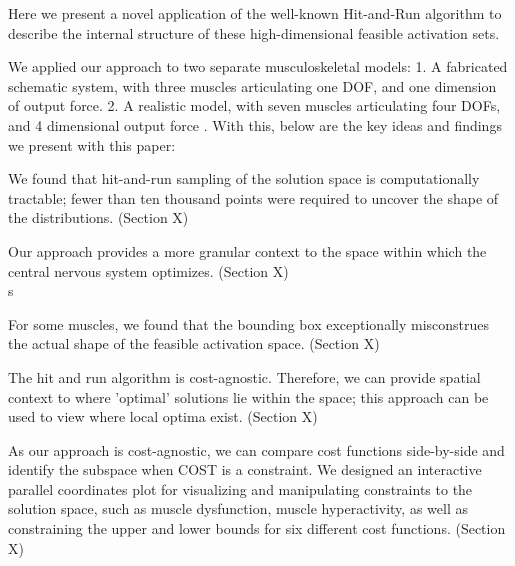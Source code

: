 Here we present a novel application of the well-known Hit-and-Run algorithm \cite{smith1984efficient} to describe the internal structure of these high-dimensional feasible activation sets.

We applied our approach to two separate musculoskeletal models:
1. A fabricated schematic system, with three muscles articulating one DOF, and one dimension of output force.
2. A realistic model, with seven muscles articulating four DOFs, and 4 dimensional output force \cite{Valero-Cuevas1998Large}.
With this, below are the key ideas and findings we present with this paper:\\ 

\begin{itemize}

\end{itemize}
\item We found that hit-and-run sampling of the solution space is computationally tractable; fewer than ten thousand points were required to uncover the shape of the distributions. (Section X)\\
\item Our approach provides a more granular context to the space within which the central nervous system optimizes. (Section X)\\s
\item For some muscles, we found that the bounding box exceptionally misconstrues the actual shape of the feasible activation space. (Section X)\\
\item The hit and run algorithm is cost-agnostic. Therefore, we can provide spatial context to where 'optimal' solutions lie within the space; this approach can be used to view where local optima exist. (Section X)\\
\item As our approach is cost-agnostic, we can compare cost functions side-by-side and identify the subspace when COST is a constraint. We designed an interactive parallel coordinates plot for visualizing and manipulating constraints to the solution space, such as muscle dysfunction, muscle hyperactivity, as well as constraining the upper and lower bounds for six different cost functions. (Section X)\\

